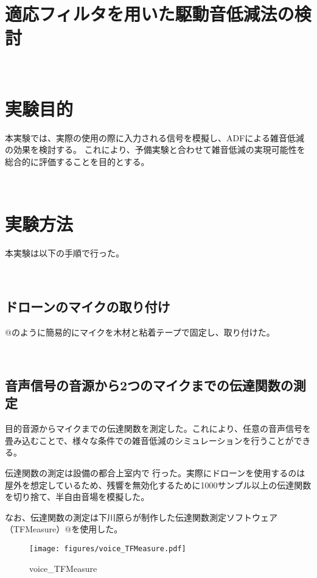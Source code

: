 \
\section{適応フィルタを用いた駆動音低減法の検討}\label{ux9069ux5fdcux30d5ux30a3ux30ebux30bfux3092ux7528ux3044ux305fux99c6ux52d5ux97f3ux4f4eux6e1bux6cd5ux306eux691cux8a0e}

\
\section{実験目的}\label{ux5b9fux9a13ux76eeux7684}

本実験では、実際の使用の際に入力される信号を模擬し、ADFによる雑音低減の効果を検討する。
これにより、予備実験と合わせて雑音低減の実現可能性を総合的に評価することを目的とする。

\
\section{実験方法}\label{ux5b9fux9a13ux65b9ux6cd5}

本実験は以下の手順で行った。

\
\subsection{ドローンのマイクの取り付け}\label{ux30c9ux30edux30fcux30f3ux306eux30deux30a4ux30afux306eux53d6ux308aux4ed8ux3051}

@のように簡易的にマイクを木材と粘着テープで固定し、取り付けた。

\
\subsection{音声信号の音源から2つのマイクまでの伝達関数の測定}\label{ux97f3ux58f0ux4fe1ux53f7ux306eux97f3ux6e90ux304bux30892ux3064ux306eux30deux30a4ux30afux307eux3067ux306eux4f1dux9054ux95a2ux6570ux306eux6e2cux5b9a}

目的音源からマイクまでの伝達関数を測定した。これにより、任意の音声信号を畳み込むことで、様々な条件での雑音低減のシミュレーションを行うことができる。

伝達関数の測定は設備の都合上室内で行った。実際にドローンを使用するのは屋外を想定しているため、残響を無効化するために1000サンプル以上の伝達関数を切り捨て、半自由音場を模擬した。

なお、伝達関数の測定は下川原らが制作した伝達関数測定ソフトウェア（TFMeasure）@を使用した。

\begin{figure}
\centering
\texttt{[image: figures/voice\_TFMeasure.pdf]}
\caption{voice\_TFMeasure}
\end{figure}

